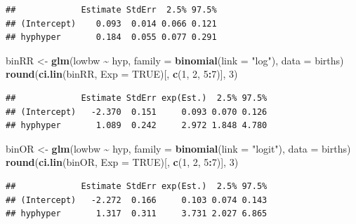 \documentclass[
]{book}
\newenvironment{Shaded}{\begin{snugshade}}{\end{snugshade}}
\newcommand{\AttributeTok}[1]{\textcolor[rgb]{0.13,0.29,0.53}{#1}}
\newcommand{\ConstantTok}[1]{\textcolor[rgb]{0.56,0.35,0.01}{#1}}
\newcommand{\DecValTok}[1]{\textcolor[rgb]{0.00,0.00,0.81}{#1}}
\newcommand{\FunctionTok}[1]{\textcolor[rgb]{0.13,0.29,0.53}{\textbf{#1}}}
\newcommand{\NormalTok}[1]{#1}
\newcommand{\OtherTok}[1]{\textcolor[rgb]{0.56,0.35,0.01}{#1}}
\newcommand{\SpecialCharTok}[1]{\textcolor[rgb]{0.81,0.36,0.00}{\textbf{#1}}}
\newcommand{\StringTok}[1]{\textcolor[rgb]{0.31,0.60,0.02}{#1}}
\begin{document}
\begin{verbatim}
##             Estimate StdErr  2.5% 97.5%
## (Intercept)    0.093  0.014 0.066 0.121
## hyphyper       0.184  0.055 0.077 0.291
\end{verbatim}

\begin{Shaded}
\begin{Highlighting}[]
\NormalTok{binRR }\OtherTok{\textless{}{-}} \FunctionTok{glm}\NormalTok{(lowbw }\SpecialCharTok{\textasciitilde{}}\NormalTok{ hyp, }\AttributeTok{family =} \FunctionTok{binomial}\NormalTok{(}\AttributeTok{link =} \StringTok{"log"}\NormalTok{), }\AttributeTok{data =}\NormalTok{ births)}
\FunctionTok{round}\NormalTok{(}\FunctionTok{ci.lin}\NormalTok{(binRR, }\AttributeTok{Exp =} \ConstantTok{TRUE}\NormalTok{)[, }\FunctionTok{c}\NormalTok{(}\DecValTok{1}\NormalTok{, }\DecValTok{2}\NormalTok{, }\DecValTok{5}\SpecialCharTok{:}\DecValTok{7}\NormalTok{)], }\DecValTok{3}\NormalTok{)}
\end{Highlighting}
\end{Shaded}

\begin{verbatim}
##             Estimate StdErr exp(Est.)  2.5% 97.5%
## (Intercept)   -2.370  0.151     0.093 0.070 0.126
## hyphyper       1.089  0.242     2.972 1.848 4.780
\end{verbatim}

\begin{Shaded}
\begin{Highlighting}[]
\NormalTok{binOR }\OtherTok{\textless{}{-}} \FunctionTok{glm}\NormalTok{(lowbw }\SpecialCharTok{\textasciitilde{}}\NormalTok{ hyp, }\AttributeTok{family =} \FunctionTok{binomial}\NormalTok{(}\AttributeTok{link =} \StringTok{"logit"}\NormalTok{), }\AttributeTok{data =}\NormalTok{ births)}
\FunctionTok{round}\NormalTok{(}\FunctionTok{ci.lin}\NormalTok{(binOR, }\AttributeTok{Exp =} \ConstantTok{TRUE}\NormalTok{)[, }\FunctionTok{c}\NormalTok{(}\DecValTok{1}\NormalTok{, }\DecValTok{2}\NormalTok{, }\DecValTok{5}\SpecialCharTok{:}\DecValTok{7}\NormalTok{)], }\DecValTok{3}\NormalTok{)}
\end{Highlighting}
\end{Shaded}

\begin{verbatim}
##             Estimate StdErr exp(Est.)  2.5% 97.5%
## (Intercept)   -2.272  0.166     0.103 0.074 0.143
## hyphyper       1.317  0.311     3.731 2.027 6.865
\end{verbatim}
\end{document}
